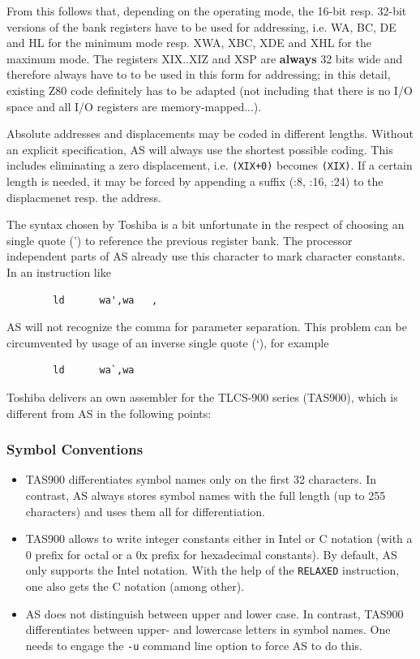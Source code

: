 \documentclass[12pt,twoside]{report}
\newcommand{\bb}[1]{{\bf #1}}
\newcommand{\tty}[1]{{\tt #1}}
\newcommand{\asname}{{AS}}
\begin{document}
From this follows that, depending on the operating mode, the 16-bit
resp. 32-bit versions of the bank registers have to be used for
addressing, i.e. WA, BC, DE and HL for the minimum mode resp. XWA,
XBC, XDE and XHL for the maximum mode.  The registers XIX..XIZ and
XSP are \bb{always} 32 bits wide and therefore always have to to be used
in this form for addressing; in this detail, existing Z80 code
definitely has to be adapted (not including that there is no I/O
space and all I/O registers are memory-mapped...).

Absolute addresses and displacements may be coded in different
lengths.  Without an explicit specification, \asname{} will always use
the shortest possible coding.  This includes eliminating a zero
displacement, i.e. \verb!(XIX+0)! becomes \verb!(XIX)!.  If a certain
length is needed, it may be forced by appending a suffix (:8, :16,
:24) to the displacmenet resp. the address.

The syntax chosen by Toshiba is a bit unfortunate in the respect of
choosing an single quote (') to reference the previous register bank.  The
processor independent parts of \asname{} already use this character to mark
character constants.  In an instruction like
\begin{verbatim}
        ld      wa',wa   ,
\end{verbatim}
\asname{} will not recognize the comma for parameter separation.  This
problem can be circumvented by usage of an inverse single quote (`), for
example
\begin{verbatim}
        ld      wa`,wa
\end{verbatim}
Toshiba delivers an own assembler for the TLCS-900 series (TAS900),
which is different from \asname{} in the following points:

\subsubsection{Symbol Conventions}

\begin{itemize}
\item{TAS900 differentiates symbol names only on the first 32
      characters.  In contrast, \asname{} always stores symbol names with the
      full length (up to 255 characters) and uses them all for
      differentiation.}
\item{TAS900 allows to write integer constants either in Intel or C
      notation (with a 0 prefix for octal or a 0x prefix for hexadecimal
      constants).  By default, \asname{} only supports the Intel notation.
      With the help of the \tty{RELAXED} instruction, one also gets the C
      notation (among other).}
\item{\asname{} does not distinguish between upper and lower case.  In
      contrast, TAS900 differentiates between upper- and lowercase
      letters in symbol names.  One needs to engage the \tty{-u} command
      line option to force \asname{} to do this.}
\end{itemize}
\end{document}
